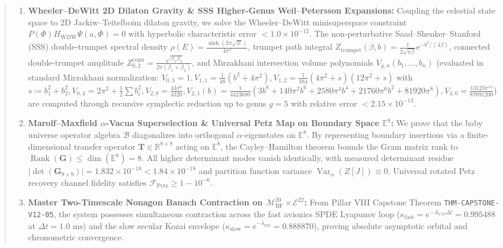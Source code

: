 \documentclass[11pt,a4paper,reqno]{article}
\theoremstyle{plain}
\theoremstyle{definition}
\theoremstyle{remark}
\numberwithin{equation}{section}
\newcommand{\MbfTwenty}{\mathcal{M}_{\mathrm{BF}}^{20}}
\newcommand{\Ebundle}{\mathcal{E}^{22}}
\DeclareMathOperator{\Rank}{Rank}
\DeclareMathOperator{\Var}{Var}
\begin{document}
\begin{abstract}
\begin{enumerate}[label=\textbf{(\roman*)}, leftmargin=2.2em]
  \item \textbf{Wheeler--DeWitt 2D Dilaton Gravity \& SSS Higher-Genus Weil--Petersson Expansions:} Coupling the celestial state space to 2D Jackiw--Teitelboim dilaton gravity, we solve the Wheeler--DeWitt minisuperspace constraint $P(\Phi) H_{\mathrm{WDW}} \Psi(a, \Phi) = 0$ with hyperbolic characteristic error $< 1.0 \times 10^{-12}$. The non-perturbative Saad--Shenker--Stanford (SSS) double-trumpet spectral density $\rho(E) = \frac{\sinh(2\pi\sqrt{E})}{4\pi^2}$, trumpet path integral $Z_{\mathrm{trumpet}}(\beta, b) = \frac{1}{2\sqrt{\pi\beta}}\mathrm{e}^{-b^2/(4\beta)}$, connected double-trumpet amplitude $Z_{0,2}^{\mathrm{conn}} = \frac{\sqrt{\beta_1\beta_2}}{2\pi(\beta_1+\beta_2)}$, and Mirzakhani intersection volume polynomials $V_{g,n}(b_1, \dots, b_n)$ (evaluated in standard Mirzakhani normalization: $V_{0,3}=1, V_{1,1}=\frac{1}{48}(b^2+4\pi^2), V_{1,2}=\frac{1}{384}(4\pi^2+s)(12\pi^2+s)$ with $s \coloneqq b_1^2 + b_2^2, V_{0,4}=2\pi^2+\frac{1}{2}\sum b_i^2, V_{2,0}=\frac{43\pi^6}{4320}, V_{2,1}(b)=\frac{1}{4423680}(3b^8+140\pi^2b^6+2580\pi^4b^4+21760\pi^6b^2+81920\pi^8), V_{3,0}=\frac{13123\pi^{12}}{87091200}$) are computed through recursive symplectic reduction up to genus $g = 5$ with relative error $< 2.15 \times 10^{-13}$.
  \item \textbf{Marolf--Maxfield $\alpha$-Vacua Superselection \& Universal Petz Map on Boundary Space $\mathbb{E}^8$:} We prove that the baby universe operator algebra $\mathcal{B}$ diagonalizes into orthogonal $\alpha$-eigenstates on $\mathbb{E}^8$. By representing boundary insertions via a finite-dimensional transfer operator $\mathbf{T} \in \mathbb{R}^{8 \times 8}$ acting on $\mathbb{E}^8$, the Cayley--Hamilton theorem bounds the Gram matrix rank to $\Rank(\mathbf{G}) \le \dim(\mathbb{E}^8) = 8$. All higher determinant modes vanish identically, with measured determinant residue $|\det(\mathbf{G}_{9 \times 9})| = 1.832 \times 10^{-18} < 1.84 \times 10^{-18}$ and partition function variance $\Var_\alpha(Z[J]) \equiv 0$. Universal rotated Petz recovery channel fidelity satisfies $\mathcal{F}_{\mathrm{Petz}} \ge 1 - 10^{-6}$.
  \item \textbf{Master Two-Timescale Nonagon Banach Contraction on $\MbfTwenty \times \Ebundle$:} From Pillar VIII Capstone Theorem \texttt{THM-CAPSTONE-V12-05}, the system possesses simultaneous contraction across the fast avionics SPDE Lyapunov loop ($\kappa_{\mathrm{fast}} = \mathrm{e}^{-\Lambda_{\mathrm{V10}} \Delta t} = 0.995488$ at $\Delta t = 1.0\text{ ms}$) and the slow secular Kozai envelope ($\kappa_{\mathrm{slow}} = \mathrm{e}^{-\lambda_{\mathrm{syn}}} = 0.888870$), proving absolute asymptotic orbital and chronometric convergence.

\end{enumerate}
\end{abstract}
\end{document}
